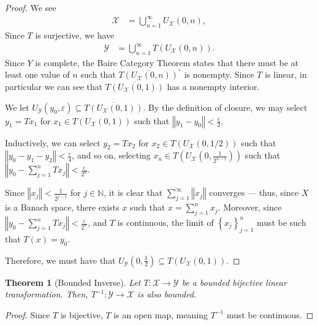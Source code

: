 \documentclass[12pt]{extarticle}
\newcommand{\N}{\mathbb{N}}
\newcommand{\norm}[1]{\left\Vert #1\right\Vert}
\newcommand{\set}[1]{\left\{#1\right\}}
\newcommand{\ve}{\varepsilon}
\theoremstyle{plain}
\newtheorem*{theorem}{Theorem}
\theoremstyle{definition}
\theoremstyle{note}
\renewcommand{\newline}{\hfill\break}
\begin{document}
\begin{proof}
  We see
  \begin{align*}
    \mathcal{X} &= \bigcup_{n=1}^{\infty}U_{\mathcal{X}}(0,n),
  \end{align*}
  Since $T$ is surjective, we have
  \begin{align*}
    \mathcal{Y} &= \bigcup_{n=1}^{\infty}T\left(U_{\mathcal{X}}(0,n)\right).
  \end{align*}
  Since $Y$ is complete, the Baire Category Theorem states that there must be at least one value of $n$ such that $\overline{T\left(U_{\mathcal{X}}(0,n)\right)}^{\circ}$ is nonempty. Since $T$ is linear, in particular we can see that $\overline{T\left(U_{\mathcal{X}}(0,1)\right)}$ has a nonempty interior.\newline

  We let $U_{\mathcal{Y}}\left(y_0,\ve\right)\subseteq \overline{T\left(U_{\mathcal{X}}(0,1)\right)}$. By the definition of closure, we may select $y_1 = Tx_1$ for $x_1 \in T\left(U_{\mathcal{X}}(0,1)\right)$ such that $\norm{y_1 - y_0} < \frac{\ve}{2}$. \newline

  Inductively, we can select $y_2 = Tx_2$ for $x_2 \in T\left(U_{\mathcal{X}}(0,1/2)\right)$ such that $\norm{y_0 - y_1 - y_2} < \frac{\ve}{4}$, and so on, selecting $x_n\in T\left(U_{\mathcal{X}}\left(0,\frac{1}{2^{n-1}}\right)\right)$ such that $\norm{y_0 - \sum_{j=1}^{n}Tx_j} < \frac{\ve}{2^{n}}$.\newline

  Since $\norm{x_j} < \frac{1}{2^{j-1}}$ for $j\in \N$, it is clear that $\sum_{j=1}^{\infty}\norm{x_j}$ converges --- thus, since $X$ is a Banach space, there exists $x$ such that $x = \sum_{j=1}^{n}x_j$. Moreover, since $\norm{y_0 - \sum_{j=1}^{n}Tx_j} < \frac{\ve}{2^n}$, and $T$ is continuous, the limit of $\set{x_j}_{j=1}^{n}$ must be such that $T(x) = y_0$.\newline

  Therefore, we must have that $U_{\mathcal{Y}}\left(0,\frac{1}{2}\right)\subseteq T\left(U_{\mathcal{X}}\left(0,1\right)\right)$.
\end{proof}
\begin{theorem}[Bounded Inverse]
  Let $T: \mathcal{X}\rightarrow \mathcal{Y}$ be a bounded bijective linear transformation. Then, $T^{-1}:\mathcal{Y}\rightarrow \mathcal{X}$ is also bounded.
\end{theorem}
\begin{proof}
  Since $T$ is bijective, $T$ is an open map, meaning $T^{-1}$ must be continuous.
\end{proof}
\end{document}
